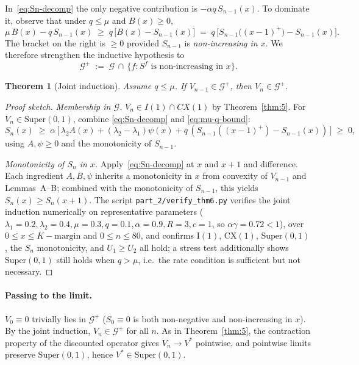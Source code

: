 \documentclass[11pt,a4paper]{article}
\newcommand{\Cx}{CX}
\newcommand{\Iclass}{I}
\newtheorem{theorem}{Theorem}
\theoremstyle{definition}
\begin{document}
In~\eqref{eq:Sn-decomp} the only negative contribution is
$-\alpha q\, S_{n-1}(x)$. To dominate it, observe that under
$q \le \mu$ and $B(x) \ge 0$,
\begin{equation}
\label{eq:mu-q-bound}
\mu\, B(x) - q\, S_{n-1}(x) \;\ge\; q\,\bigl[ B(x) - S_{n-1}(x) \bigr]
\;=\; q\,\bigl[ S_{n-1}\bigl((x-1)^+\bigr) - S_{n-1}(x) \bigr].
\end{equation}
The bracket on the right is $\ge 0$ provided $S_{n-1}$ is
\emph{non-increasing in $x$}. We therefore strengthen the inductive
hypothesis to
\[
    \mathcal{G}^+ \;:=\; \mathcal{G}\, \cap\, \{f : S^f \text{ is non-increasing in } x\}.
\]

\begin{theorem}[Joint induction]
\label{thm:joint}
Assume $q \le \mu$. If $V_{n-1} \in \mathcal{G}^+$, then $V_n \in \mathcal{G}^+$.
\end{theorem}

\begin{proof}[Proof sketch]
\emph{Membership in $\mathcal{G}$.} $V_n \in \Iclass(1) \cap \Cx(1)$
by Theorem~\ref{thm:5}. For $V_n \in \mathrm{Super}(0, 1)$, combine
\eqref{eq:Sn-decomp} and \eqref{eq:mu-q-bound}:
\[
    S_n(x) \;\ge\; \alpha\,\bigl[\, \lambda_2 A(x) + (\lambda_2 - \lambda_1) \psi(x) + q\,(S_{n-1}((x-1)^+) - S_{n-1}(x))\, \bigr] \;\ge\; 0,
\]
using $A, \psi \ge 0$ and the monotonicity of $S_{n-1}$.

\emph{Monotonicity of $S_n$ in $x$.} Apply~\eqref{eq:Sn-decomp} at
$x$ and $x+1$ and difference. Each ingredient $A, B, \psi$ inherits
a monotonicity in $x$ from convexity of $V_{n-1}$ and Lemmas~A--B;
combined with the monotonicity of $S_{n-1}$, this yields
$S_n(x) \ge S_n(x+1)$. The script
\texttt{part\_2/verify\_thm6.py} verifies the joint induction
numerically on representative parameters
($\lambda_1 = 0.2, \lambda_2 = 0.4, \mu = 0.3, q = 0.1,
\alpha = 0.9, R = 3, c = 1$, so $\alpha\gamma = 0.72 < 1$), over
$0 \le x \le K{-}\text{margin}$ and $0 \le n \le 80$, and confirms
$\mathrm{I}(1)$, $\mathrm{CX}(1)$, $\mathrm{Super}(0,1)$, the $S_n$
monotonicity, and $U_1 \ge U_2$ all hold; a stress test additionally
shows $\mathrm{Super}(0,1)$ still holds when $q > \mu$, i.e.\ the rate
condition is sufficient but not necessary.
\end{proof}

\paragraph{Passing to the limit.}
$V_0 \equiv 0$ trivially lies in $\mathcal{G}^+$ ($S_0 \equiv 0$ is
both non-negative and non-increasing in $x$). By the joint induction,
$V_n \in \mathcal{G}^+$ for all $n$. As in
Theorem~\ref{thm:5}, the contraction property of the discounted
operator gives $V_n \to V^*$ pointwise, and pointwise limits preserve
$\mathrm{Super}(0, 1)$, hence $V^* \in \mathrm{Super}(0, 1)$.
\end{document}
